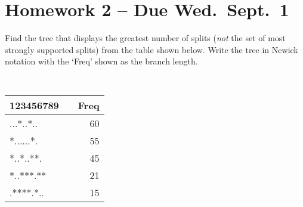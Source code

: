 \documentclass[landscape]{foils}
\begin{document}
\pagecolor{white}
\unitlength=1mm
\myNewSlide
\section*{Homework 2 -- Due Wed.~Sept.~1}
Find the tree that displays the greatest number of splits ({\em not} the set of most strongly supported splits) from the table shown below.
Write the tree in Newick notation with the `Freq' shown as the branch length.
\begin{center}
{\tt 
\begin{tabular}{|lp{0.1cm}r|}
\hline
123456789 & & Freq \\
\hline
...*..*.. & & 60 \\
*......*. & & 55 \\
*..*..**. & & 45 \\
*..***.** & & 21 \\
.****.*.. & & 15 \\
\hline
\end{tabular}
}
\end{center}
\end{document}
